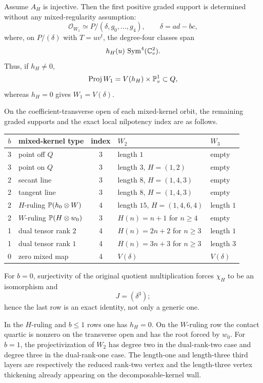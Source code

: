 \begin{theorem}
\label{thm:corank-two-mixed-kernel-atlas}
Assume \(A_H\) is injective.  Then the first positive graded support
is determined without any mixed-regularity assumption:
\begin{equation}\label{eq:W1-all-Ainj}
 \mathcal O_{W_1}
 \simeq
 P/(\delta,g_0,\ldots,g_4),
 \qquad \delta=ad-bc,
\end{equation}
where, on \(P/(\delta)\) with \(T=uv^t\), the degree-four classes
span
\[
 h_H(u)\,\operatorname{Sym}^4(\mathbb C^2_v).
\]
Thus, if \(h_H\ne0\),
\[
 \operatorname{Proj} W_1=V(h_H)\times\mathbb P^1_v\subset Q,
\]
whereas \(h_H=0\) gives \(W_1=V(\delta)\).

On the coefficient-transverse open of each mixed-kernel orbit, the
remaining graded supports and the exact local nilpotency index are as
follows.
\begin{center}
\small
\begin{tabular}{@{}c l c l l@{}}
\toprule
\(b\)&mixed-kernel type&index&\(W_2\)&\(W_3\)\\
\midrule
3&point off \(Q\)&3&length \(1\)&empty\\
3&point on \(Q\)&3&length \(3\), \(H=(1,2)\)&empty\\
2&secant line&3&length \(8\), \(H=(1,4,3)\)&empty\\
2&tangent line&3&length \(8\), \(H=(1,4,3)\)&empty\\
2&\(H\)-ruling \(\mathbb P(h_0\otimes W)\)&4&length \(15\), \(H=(1,4,6,4)\)&length \(1\)\\
2&\(W\)-ruling \(\mathbb P(H\otimes w_0)\)&3&
 \(H(n)=n+1\) for \(n\ge4\)&empty\\
1&dual tensor rank \(2\)&4&
 \(H(n)=2n+2\) for \(n\ge3\)&length \(1\)\\
1&dual tensor rank \(1\)&4&
 \(H(n)=3n+3\) for \(n\ge3\)&length \(3\)\\
0&zero mixed map&4&\(V(\delta)\)&\(V(\delta)\)\\
\bottomrule
\end{tabular}
\end{center}
For \(b=0\), surjectivity of the original quotient multiplication
forces \(\chi_H\) to be an isomorphism and
\begin{equation}\label{eq:b0-delta3}
 J=(\delta^3);
\end{equation}
hence the last row is an exact identity, not only a generic one.

In the \(H\)-ruling and \(b\le1\) rows one has \(h_H=0\).  On the
\(W\)-ruling row the contact quartic is nonzero on the transverse open
and has the root forced by \(w_0\).
For \(b=1\), the projectivization of \(W_2\) has degree two in the
dual-rank-two case and degree three in the dual-rank-one case.  The
length-one and length-three third layers are respectively the reduced
rank-two vertex and the length-three vertex thickening already
appearing on the decomposable-kernel wall.
\end{theorem}

